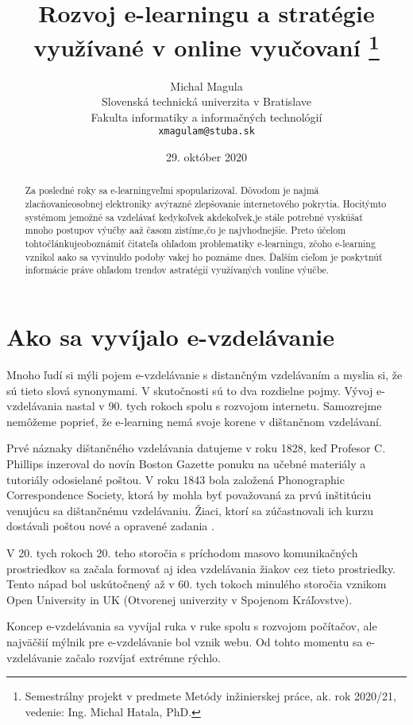 \documentclass[10pt,slovak,a4paper]{article}
\title
{
	Rozvoj e-learningu a stratégie využívané v online vyučovaní
	\thanks
	{
		Semestrálny projekt v predmete Metódy inžinierskej práce, ak. rok 2020/21, vedenie: Ing. Michal Hatala, PhD.
	}
} %
\author{Michal Magula\\[2pt]
	{\small Slovenská technická univerzita v Bratislave}\\
	{\small Fakulta informatiky a informačných technológií}\\
	{\small \texttt{xmagulam@stuba.sk}}
	}
\date{\small 29. október 2020}
\begin{document}
\maketitle

\begin{abstract}
	Za posledné roky sa e-learningveľmi spopularizoval. Dôvodom je najmä zlacňovanieosobnej elektroniky avýrazné zlepšovanie internetového pokrytia. Hocitýmto systémom jemožné sa vzdelávať kedykoľvek akdekoľvek,je stále potrebné vyskúšať mnoho postupov výučby aaž časom zistíme,čo je najvhodnejšie. Preto účelom tohtočlánkujeoboznámiť čitateľa ohľadom problematiky e-learningu, zčoho e-learning vznikol aako sa vyvinuldo podoby vakej ho poznáme dnes. Ďalším cieľom je poskytnúť informácie práve ohľadom trendov astratégií využívaných vonline výučbe.
\end{abstract}

\section{Ako sa vyvíjalo e-vzdelávanie} \label{Evolution}

	Mnoho ľudí si mýli pojem e-vzdelávanie s distančným vzdelávaním a myslia si, že sú tieto slová synonymami.
	V skutočnosti sú to dva rozdielne pojmy. Vývoj e-vzdelávania nastal v 90. tych rokoch spolu s rozvojom internetu.
	Samozrejme nemôžeme poprieť, že e-learning nemá svoje korene v dištančnom vzdelávaní.\cite{main}

	Prvé náznaky dištančného vzdelávania datujeme v roku 1828, keď Profesor C. Phillips inzeroval do novín
	Boston Gazette ponuku na učebné materiály a tutoriály odosielané poštou. V roku 1843 bola 
	založená Phonographic Correspondence Society, ktorá by mohla byť považovaná za prvú inštitúciu 
	venujúcu sa dištančnému vzdelávaniu. Žiaci, ktorí sa zúčastnovali ich kurzu dostávali poštou
	nové a opravené zadania \cite{main}.

	V 20. tych rokoch 20. teho storočia s príchodom masovo komunikačných prostriedkov sa začala formovať aj idea
	vzdelávania žiakov cez tieto prostriedky. Tento nápad bol uskútočnený až v 60. tych tokoch minulého storočia 
	vznikom Open University in UK (Otvorenej univerzity v Spojenom Kráľovstve).\cite{main}

	Koncep e-vzdelávania sa vyvíjal ruka v ruke spolu s rozvojom počítačov, ale 
	najväčšií mýlnik pre e-vzdelávanie bol vznik webu. Od tohto momentu sa 
	e-vzdelávanie začalo rozvíjať extrémne rýchlo.\cite{main}
\end{document}
